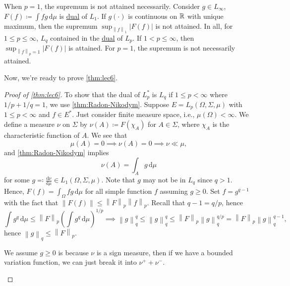 
\begin{remark}
	When \(p = 1\), the supremum is not attained necessarily. Consider \(g\in L_{\infty} \), \(F(f) \coloneqq \int fg\,\mathrm{d} \mu \) is \hyperref[def:dual-space]{dual} of \(L_1\). If \(g(\cdot)\) is continuous on \(\mathbb{\MakeUppercase{r}} \) with unique maximum, then the supremum \(\sup _{\left\lVert f\right\rVert _1}\left\vert F(f) \right\vert\) is not attained. In all, for \(1 \leq p\leq \infty \), \(L_q\) contained in the \hyperref[def:dual-space]{dual} of \(L_p\). If \(1 < p \leq \infty \), then \(\sup _{\left\lVert f\right\rVert _p = 1} \left\vert F(f) \right\vert \) is attained. For \(p = 1\), the supremum is not necessarily attained.
\end{remark}

Now, we're ready to prove \autoref{thm:lec6}.

\begin{proof}[Proof of \autoref{thm:lec6}]
	To show that the dual of \(L_p^{\ast}\) is \(L_q\) if \(1 \leq p < \infty \) where \(1 / p + 1 / q = 1\), we use \autoref{thm:Radon-Nikodym}. Suppose \(E = L_p(\Omega , \Sigma , \mu )\) with \(1 \leq p < \infty \) and \(f\in E^{\ast} \). Just consider finite measure space, i.e., \(\mu (\Omega ) < \infty \). We define a measure \(\nu \) on \(\Sigma \) by \(\nu (A) \coloneqq F(\chi _A)\) for \(A\in \Sigma \), where \(\chi _A\) is the characteristic function of \(A\). We see that
	\[
		\mu (A) = 0 \implies \nu (A) = 0 \implies \nu \ll \mu,
	\]
	and \autoref{thm:Radon-Nikodym} implies
	\[
		\nu (A) = \int _A g\,\mathrm{d} \mu
	\]
	for some \(g \eqqcolon \frac{\mathrm{d}\nu }{\mathrm{d}\mu } \in L_1(\Omega , \Sigma , \mu )\). Note that \(g\) may not be in \(L_q\) since \(q > 1\). Hence, \(F(f)= \int _\Omega fg \,\mathrm{d} \mu \) for all simple function \(f\) assuming \(g \geq 0\). Set \(f = g^{q - 1}\) with the fact that \(\left\lVert F(f)\right\rVert \leq \left\lVert F\right\rVert _p \left\lVert f\right\rVert _p\). Recall that \(q - 1 = q / p\), hence
	\[
		\int g^q\,\mathrm{d} \mu \leq \left\lVert F\right\rVert _p \left( \int g^q \,\mathrm{d} \mu  \right) ^{1 / p} \implies \left\lVert g\right\rVert _q ^q \leq \left\lVert g\right\rVert _q^q \leq \left\lVert F\right\rVert _p \left\lVert g\right\rVert _q ^{q / p} = \left\lVert F\right\rVert _p \left\lVert g\right\rVert _q ^{q - 1},
	\]
	hence \(\left\lVert g\right\rVert _q \leq \left\lVert F\right\rVert _p\).

	\begin{note}
		We assume \(g \geq 0\) is because \(\nu \) is a sign measure, then if we have a bounded variation function, we can just break it into \(\nu ^+ + \nu ^-\).
	\end{note}
\end{proof}

